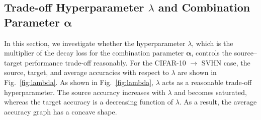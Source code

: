 \documentclass[letterpaper]{article}
\begin{document}
\begin{table}[t]
\caption{Source accuracies at required target accuracy[\%] of each method. The second column represents sequential learning on three tasks.}
\begin{center}
\end{center}
\label{tab:result2-prac}
\end{table}





\subsection{Trade-off Hyperparameter $\lambda$ and Combination Parameter $\bm{\alpha}$}



In this section, we investigate whether the hyperparameter $\lambda$, which is the multiplier of the decay loss for the combination parameter $\bm{\alpha}$, controls the source--target performance trade-off reasonably. For the CIFAR-10 $\rightarrow$ SVHN case, the source, target, and average accuracies with respect to $\lambda$ are shown in Fig.~\ref{fig:lambda}.
As shown in Fig.~\ref{fig:lambda}, $\lambda$ acts as a reasonable trade-off hyperparameter. The source accuracy increases with $\lambda$ and becomes saturated, whereas the target accuracy is a decreasing function of $\lambda$. As a result, the average accuracy graph has a concave shape.
\end{document}
